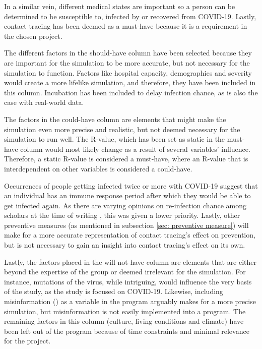 In a similar vein, different medical states are important so a person can be determined to be susceptible to, infected by or recovered from COVID-19. Lastly, contact tracing has been deemed as a must-have because it is a requirement in the chosen project.

The different factors in the should-have column have been selected because they are important for the simulation to be more accurate, but not necessary for the simulation to function. Factors like hospital capacity, demographics and severity would create a more lifelike simulation, and therefore, they have been included in this column. Incubation has been included to delay infection chance, as is also the case with real-world data.
 
The factors in the could-have column are elements that might make the simulation even more precise and realistic, but not deemed necessary for the simulation to run well. The R-value, which has been set as static in the must-have column would most likely change as a result of several variables' influence. Therefore, a static R-value is considered a must-have, where an R-value that is interdependent on other variables is considered a could-have.

Occurrences of people getting infected twice or more with COVID-19 suggest that an individual has an immune response period after which they would be able to get infected again. As there are varying opinions on re-infection chance among scholars at the time of writing \citep{malkov_simulation_2020}, this was given a lower priority. Lastly, other preventive measures (as mentioned in subsection \ref{sec: preventive measure}) will make for a more accurate representation of contact tracing's effect on prevention, but is not necessary to gain an insight into contact tracing's effect on its own.

Lastly, the factors placed in the will-not-have column are elements that are either beyond the expertise of the group or deemed irrelevant for the simulation. For instance, mutations of the virus, while intriguing, would influence the very basis of the study, as the study is focused on COVID-19. Likewise, including misinformation () as a variable in the program arguably makes for a more precise simulation, but misinformation is not easily implemented into a program. The remaining factors in this column (culture, living conditions and climate) have been left out of the program because of time constraints and minimal relevance for the project.

